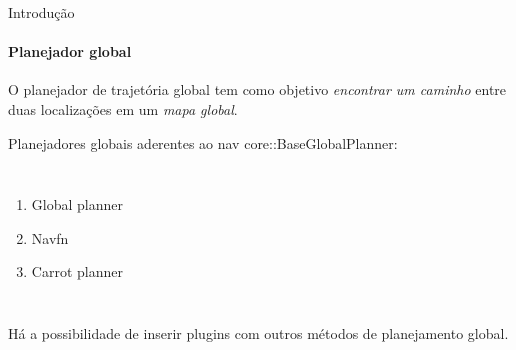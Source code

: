 \begin{frame}[t]{Introdução} 
    \framesubtitle{Planejador global}
    O planejador de trajetória global tem como objetivo \emph{encontrar um caminho} entre duas localizações em um \emph{mapa global}.

    Planejadores globais aderentes ao nav core::BaseGlobalPlanner:
        \begin{columns}[t]
                \begin{enumerate}
                    \item Global planner
                    \item Navfn
                    \item Carrot planner
                \end{enumerate}
            \begin{center}
                \begin{figure}
                \end{figure}
            \end{center}
        \end{columns}
        \vspace*{0.6cm}
        Há a possibilidade de inserir plugins com outros métodos de planejamento global.
\end{frame}
